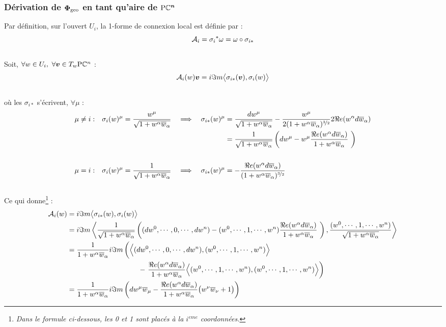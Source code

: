 \subsubsection{Dérivation de $\bf{\phaseg}$ en tant qu'aire de $\bf{\PC{n}}$} \label{ann:phaseg=aire}

Par définition, sur l'ouvert $U_i$, la 1-forme de connexion local est définie par :
\[\locconn_i = {\sigma_i}^*\conn = \conn\circ \sigma_{i*}\]
\\
Soit, $\forall w\in U_i,\ \forall \bf{v}\in\tg[w]{\PC{n}}$ :
\[\locconn_i(w)\bf{v}= i\Im m \big\langle \sigma_{i*}(\bf{v}), \sigma_i(w) \big\rangle\]
\\
où les $\sigma_{i*}$ s'écrivent, $\forall \mu$ :
\begin{align*}
	\mu &\neq i : &  \sigma_i(w)^\mu = \frac{w^\mu}{\sqrt{1 + w^\alpha\congu{w}_\alpha}}\quad \Lr\quad
	\sigma_{i*}(w)^\mu &= \frac{dw^\mu}{\sqrt{1 + w^\alpha\congu{w}_\alpha}} - \frac{w^\mu}{2(1 + w^\alpha\congu{w}_\alpha)^{\nicefrac{3}{2}}}2\Re e(w^\alpha d\congu{w}_\alpha) \\
	&  &  &= \frac{1}{\sqrt{1 + w^\alpha\congu{w}_\alpha}}\left(dw^\mu - w^\mu \frac{\Re e(w^\alpha d\congu{w}_\alpha)}{1 + w^\alpha\congu{w}_\alpha}\ \right)
	\\ \\
	\mu &= i :  &  \sigma_i(w)^\mu = \frac{1}{\sqrt{1 + w^\alpha\congu{w}_\alpha}}\quad \Lr\quad
	\sigma_{i*}(w)^\mu &= - \frac{\Re e(w^\alpha d\congu{w}_\alpha)}{(1 + w^\alpha\congu{w}_\alpha)^{\nicefrac{3}{2}}}
\end{align*}
\\
Ce qui donne\footnote{\itshape
	Dans le formule ci-dessous, les 0 et 1 sont placés à la $i^{eme}$ coordonnées.
} :
\begin{align*}
	\locconn_i(w) &= i\Im m \big\langle \sigma_{i*}(w), \sigma_i(w) \big\rangle \\
	&= i\Im m \left\langle \frac{1}{\sqrt{1 + w^\alpha\congu{w}_\alpha}}\left((dw^0,\cdots , 0, \cdots, dw^n) - (w^0,\cdots , 1, \cdots, w^n) \frac{\Re e(w^\alpha d\congu{w}_\alpha)}{1 + w^\alpha\congu{w}_\alpha}\ \right), \frac{(w^0,\cdots , 1, \cdots, w^n)}{\sqrt{1 + w^\alpha\congu{w}_\alpha}} \right\rangle \\
	&= \frac{1}{1 + w^\alpha\congu{w}_\alpha} i\Im m \left( \Big\langle (dw^0,\cdots , 0, \cdots, dw^n), (w^0,\cdots , 1, \cdots, w^n) \Big\rangle \bigg. \right. \\
	&\qquad\qquad\qquad\qquad\qquad - \left.  \frac{\Re e(w^\alpha d\congu{w}_\alpha)}{1 + w^\alpha\congu{w}_\alpha}\Big\langle (w^0,\cdots , 1, \cdots, w^n) , (w^0,\cdots , 1, \cdots, w^n) \Big\rangle \right) \\
	&= \frac{1}{1 + w^\alpha\congu{w}_\alpha} i\Im m \left( dw^\mu\congu{w}_\mu -  \frac{\Re e(w^\alpha d\congu{w}_\alpha)}{1 + w^\alpha\congu{w}_\alpha}\big( w^\nu\congu{w}_\nu +1 \big) \right)
\end{align*}
